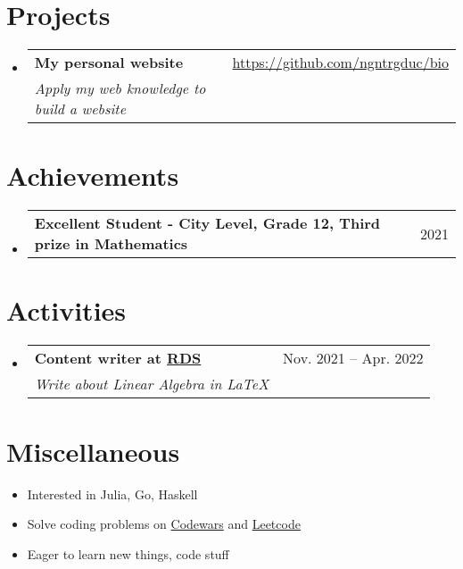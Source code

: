 \documentclass[letterpaper,11pt]{article}
\makeatletter
\newcommand{\resumeItem}[1]{
  \item\small{
    {#1 \vspace{-4pt}}
  }
}
\newcommand{\resumeSubheadTwo}[2]{
  \vspace{-1pt}\item
    \begin{tabular*}{0.97\textwidth}[t]{l@{\extracolsep{\fill}}r}
      \textbf{#1} & #2
    \end{tabular*}\vspace{-5pt}
}
\newcommand{\resumeSubheadThree}[3]{
  \vspace{-1pt}\item
    \begin{tabular*}{0.97\textwidth}[t]{l@{\extracolsep{\fill}}r}
      \textbf{#1} & #2 \\
      \textit{\normalsize#3}
    \end{tabular*}\vspace{-5pt}
}
\newcommand{\resumeSubHeadingListStart}{\begin{itemize}[leftmargin=*]}
\newcommand{\resumeSubHeadingListEnd}{\end{itemize}}
\makeatother
\begin{document}
\section{Projects}
    \resumeSubHeadingListStart
        \resumeSubheadThree{My personal website}{\href{https://github.com/ngntrgduc/bio}{https://github.com/ngntrgduc/bio}}{Apply my web knowledge to build a website}
    \resumeSubHeadingListEnd




\section{Achievements}
    \resumeSubHeadingListStart
        \resumeSubheadTwo{Excellent Student - City Level, Grade 12, Third prize in Mathematics}{2021}
    \resumeSubHeadingListEnd


\section{Activities}
    \resumeSubHeadingListStart
        \resumeSubheadThree{Content writer at \href{https://www.facebook.com/RDSproject/}{RDS}}{Nov. 2021 -- Apr. 2022}{Write about Linear Algebra in LaTeX}
    \resumeSubHeadingListEnd
    
    
 \section{Miscellaneous}
    \resumeSubHeadingListStart
        \resumeItem{Interested in Julia, Go, Haskell}
        \resumeItem{Solve coding problems on \href{https://www.codewars.com/users/ngntrgduc}{Codewars} and \href{https://leetcode.com/ngntrgduc/}{Leetcode}}
        \resumeItem{Eager to learn new things, code stuff}
    \resumeSubHeadingListEnd
    
    
\end{document}
